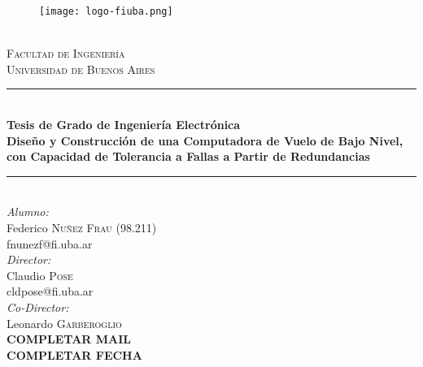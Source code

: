 \begin{titlepage}
\newcommand{\HRule}{\rule{\linewidth}{0.5mm}}
\center
\begin{figure}[H]
    \centering
    \texttt{[image: logo-fiuba.png]}
\end{figure}
\qquad \\[0.1cm]

\textsc{\LARGE Facultad de Ingeniería}\\[0.5cm]
\textsc{\Large Universidad de Buenos Aires}\\[0.6cm]
\HRule \\[0.3cm]
{ \Large \bfseries Tesis de Grado de Ingeniería Electrónica} \\[0.3cm]
{ \Large \bfseries Diseño y Construcción de una Computadora de Vuelo de Bajo Nivel, con Capacidad de Tolerancia a Fallas a Partir de Redundancias}\\[0.1cm]
\HRule \\[0.2cm]
\Large \emph{Alumno:}\\[0,1cm]
\large Federico \textsc{Nuñez Frau} (98.211) \\
\normalsize fnunezf@fi.uba.ar\\[0.75cm]
\Large \emph{Director:}\\[0,1cm]
\large Claudio \textsc{Pose} \\[0.25cm]
\normalsize cldpose@fi.uba.ar\\[0.25cm]
\Large \emph{Co-Director:}\\[0,1cm]
\large Leonardo \textsc{Garberoglio} \\[0.25cm]
\normalsize \textbf{{\color{red} COMPLETAR MAIL}}\\[0.25cm]
\vfill
\Large \textbf{{\color{red} COMPLETAR FECHA}}
\end{titlepage}
